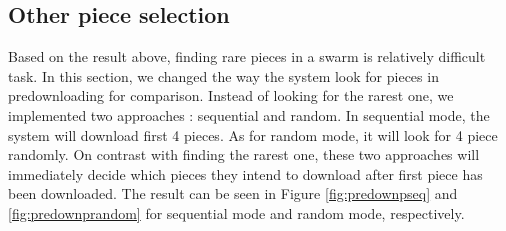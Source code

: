 \subsection{Other piece selection}
Based on the result above, finding rare pieces in a swarm is relatively difficult task. In this section, we changed the way the system look for pieces in predownloading for comparison. Instead of looking for the rarest one, we implemented two approaches : sequential and random. In sequential mode, the system will download first 4 pieces. As for random mode, it will look for 4 piece randomly. On contrast with finding the rarest one, these two approaches will immediately decide which pieces they intend to download after first piece has been downloaded. The result can be seen in Figure \ref{fig:predownpseq} and \ref{fig:predownprandom} for sequential mode and random mode, respectively. 


